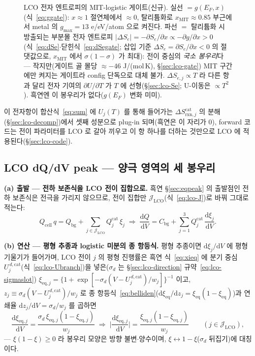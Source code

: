 \documentclass[11pt,a4paper]{article}
\newcommand{\dd}{\mathrm{d}}
\newcommand{\eq}{\mathrm{eq}}
\newcommand{\cell}{\mathrm{cell}}
\newcommand{\bg}{\mathrm{bg}}
\newcommand{\rxn}{\mathrm{rxn}}
\begin{document}
\begin{figure}[t]
\begin{tikzpicture}[x=7.2cm,y=1.0cm]
\end{tikzpicture}
\caption{LCO 전자 엔트로피의 MIT-logistic 게이트(신규). 실선 $=g(E_F,x)$(식~\eqref{eq:ggate}): $x\!\approx\!1$
절연체에서 $\approx0$, 탈리튬화로 $x_\mathrm{MIT}\!\approx\!0.85$ 부근에서 metal 의 $g_{\max}\!=\!13$ e/eV/atom 으로 켜진다.
파선 $=$ 탈리튬화 시 방출되는 부분몰 전자 엔트로피 $|\Delta S_e|=-\partial S_e/\partial x\propto-\partial g/\partial x>0$
(식~\eqref{eq:dSe}$\cdot$닫힌식~\eqref{eq:dSegate}; 삽입 기준 $\Delta S_e=\partial S_e/\partial x<0$ 의 절댓값으로,
$x_\mathrm{MIT}$ 에서 $\sigma(1-\sigma)$ 가 최대): 전이 중심의 \emph{국소
봉우리}다 — 작지만(게이트 골 몰당 $\approx-46$ J/(mol\,K), \S\ref{sec:lco-gate}) MIT 구간에만 켜지는 게이트라 config 단독으로 대체 불가.
$\Delta S_{e,j}\propto T$ 라 다른 항과 달리 전자 기여의 $\partial U/\partial T$ 가 $T$ 에 선형(\S\ref{sec:lco-Se}; U-이동은
$\propto T^2$). 흑연엔 이 봉우리가 없다($g(E_F)$ 변화 미미).}
\label{fig:lco-electronic}
\end{figure}

이 전자항이 합산식~\eqref{eq:sum} 에 $U_j(T)$ 를 통해 들어가는 $\Delta S_{\rxn,j}^\mathrm{cat}$ 의 분해
(\S\ref{sec:lco-decomp})에서 셋째 성분으로 plug-in 되며(흑연은 이 자리가 0),
forward 코드는 전이 파라미터를 LCO 로 갈아 끼우고 이 항 하나를 더하는 것만으로 LCO 에 적용된다(\S\ref{sec:lco-code}).

\subsection{LCO dQ/dV peak — 양극 영역의 세 봉우리}\label{sec:lco-peak}
\textbf{(a) 출발 — 전하 보존식을 LCO 전이 집합으로.} 흑연 \S\ref{sec:eqpeak} 의 출발점인 전하 보존식은
전극을 가리지 않으므로, 전이 집합만 $\mathcal J_\mathrm{LCO}$(식~\eqref{eq:lco-J})로 바꿔 그대로 적는다:
\begin{equation}
Q_\cell\,q=Q_\bg+\sum_{j\in\mathcal J_\mathrm{LCO}}Q_j^\mathrm{cat}\,\xi_j
\;\Longrightarrow\;
\frac{\dd Q}{\dd V}=C_\bg+\sum_{j=1}^{3}Q_j^\mathrm{cat}\,\frac{\dd\xi_j}{\dd V}.
\label{eq:lco-charge}
\end{equation}

\textbf{(b) 연산 — 평형 추종과 logistic 미분의 종 항등식.} 평형 추종이면 $\dd\xi_j/\dd V$ 에 평형 기울기가 들어가며, LCO 전이 $j$ 의 평형 진행률은 흑연 식~\eqref{eq:xieq}
에 분기 중심 $U_j^{\,d,\mathrm{cat}}$(식~\eqref{eq:lco-Ubranch})을 넣은($\sigma_d$ 는 \S\ref{sec:lco-direction} 규약~\eqref{eq:lco-sigmaslot})
$\xi_{\eq,j}=\{1+\exp[-\sigma_d(V-U_j^{\,d,\mathrm{cat}})/w_j]\}^{-1}$ 이고, $z_j\equiv\sigma_d(V-U_j^{\,d,
\mathrm{cat}})/w_j$ 로 종 항등식~\eqref{eq:belliden}($\dd\xi_\eq/\dd z_j=\xi_\eq(1-\xi_\eq)$)과 연쇄율
$\dd z_j/\dd V=\sigma_d/w_j$ 를 곱하면
\begin{equation}
\frac{\dd\xi_{\eq,j}}{\dd V}=\frac{\sigma_d\,\xi_{\eq,j}(1-\xi_{\eq,j})}{w_j}
\;\Longrightarrow\;
\Big|\frac{\dd\xi_{\eq,j}}{\dd V}\Big|=\frac{\xi_{\eq,j}(1-\xi_{\eq,j})}{w_j}
\qquad(j\in\mathcal J_\mathrm{LCO}),
\label{eq:lco-belliden}
\end{equation}
— $\xi(1-\xi)\ge0$ 라 봉우리 모양은 방향 불변$\cdot$양수이며, $\xi\leftrightarrow1-\xi$($\sigma_d$ 뒤집기)에
대칭이다.
\end{document}
